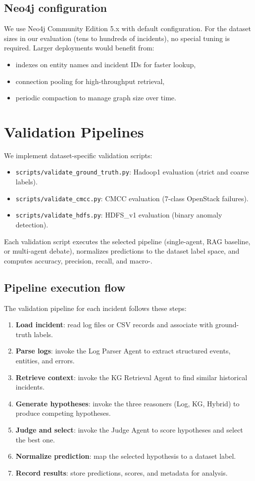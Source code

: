 \subsection{Neo4j configuration}
We use Neo4j Community Edition 5.x with default configuration. For the dataset sizes in our
evaluation (tens to hundreds of incidents), no special tuning is required. Larger deployments
would benefit from:
\begin{itemize}
  \item indexes on entity names and incident IDs for faster lookup,
  \item connection pooling for high-throughput retrieval,
  \item periodic compaction to manage graph size over time.
\end{itemize}

\section{Validation Pipelines}
We implement dataset-specific validation scripts:
\begin{itemize}
  \item \texttt{scripts/validate\_ground\_truth.py}: Hadoop1 evaluation (strict and coarse
        labels).
  \item \texttt{scripts/validate\_cmcc.py}: CMCC evaluation (7-class OpenStack failures).
  \item \texttt{scripts/validate\_hdfs.py}: HDFS\_v1 evaluation (binary anomaly detection).
\end{itemize}
Each validation script executes the selected pipeline (single-agent, RAG baseline, or multi-agent
debate), normalizes predictions to the dataset label space, and computes accuracy, precision,
recall, and macro-\fone{}.

\subsection{Pipeline execution flow}
The validation pipeline for each incident follows these steps:
\begin{enumerate}
  \item \textbf{Load incident}: read log files or CSV records and associate with ground-truth
        labels.
  \item \textbf{Parse logs}: invoke the Log Parser Agent to extract structured events, entities,
        and errors.
  \item \textbf{Retrieve context}: invoke the KG Retrieval Agent to find similar historical
        incidents.
  \item \textbf{Generate hypotheses}: invoke the three reasoners (Log, KG, Hybrid) to produce
        competing hypotheses.
  \item \textbf{Judge and select}: invoke the Judge Agent to score hypotheses and select the best
        one.
  \item \textbf{Normalize prediction}: map the selected hypothesis to a dataset label.
  \item \textbf{Record results}: store predictions, scores, and metadata for analysis.
\end{enumerate}

